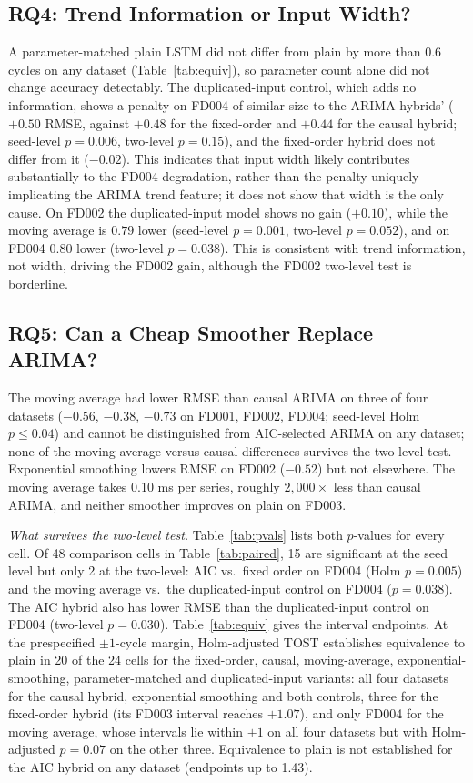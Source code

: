 \documentclass[conference]{IEEEtran}
\begin{document}
\subsection{RQ4: Trend Information or Input Width?}
A parameter-matched plain LSTM did not differ from plain by more than 0.6 cycles on any dataset (Table~\ref{tab:equiv}), so parameter count alone did not change accuracy detectably. The duplicated-input control, which adds no information, shows a penalty on FD004 of similar size to the ARIMA hybrids' ($+0.50$ RMSE, against $+0.48$ for the fixed-order and $+0.44$ for the causal hybrid; seed-level $p=0.006$, two-level $p=0.15$), and the fixed-order hybrid does not differ from it ($-0.02$). This indicates that input width likely contributes substantially to the FD004 degradation, rather than the penalty uniquely implicating the ARIMA trend feature; it does not show that width is the only cause. On FD002 the duplicated-input model shows no gain ($+0.10$), while the moving average is $0.79$ lower (seed-level $p=0.001$, two-level $p=0.052$), and on FD004 $0.80$ lower (two-level $p=0.038$). This is consistent with trend information, not width, driving the FD002 gain, although the FD002 two-level test is borderline.

\subsection{RQ5: Can a Cheap Smoother Replace ARIMA?}
The moving average had lower RMSE than causal ARIMA on three of four datasets ($-0.56$, $-0.38$, $-0.73$ on FD001, FD002, FD004; seed-level Holm $p\le0.04$) and cannot be distinguished from AIC-selected ARIMA on any dataset; none of the moving-average-versus-causal differences survives the two-level test. Exponential smoothing lowers RMSE on FD002 ($-0.52$) but not elsewhere. The moving average takes 0.10 ms per series, roughly $2{,}000\times$ less than causal ARIMA, and neither smoother improves on plain on FD003.

\emph{What survives the two-level test.} Table~\ref{tab:pvals} lists both $p$-values for every cell. Of 48 comparison cells in Table~\ref{tab:paired}, 15 are significant at the seed level but only 2 at the two-level: AIC vs.\ fixed order on FD004 (Holm $p=0.005$) and the moving average vs.\ the duplicated-input control on FD004 ($p=0.038$). The AIC hybrid also has lower RMSE than the duplicated-input control on FD004 (two-level $p=0.030$). Table~\ref{tab:equiv} gives the interval endpoints. At the prespecified $\pm1$-cycle margin, Holm-adjusted TOST establishes equivalence to plain in 20 of the 24 cells for the fixed-order, causal, moving-average, exponential-smoothing, parameter-matched and duplicated-input variants: all four datasets for the causal hybrid, exponential smoothing and both controls, three for the fixed-order hybrid (its FD003 interval reaches $+1.07$), and only FD004 for the moving average, whose intervals lie within $\pm1$ on all four datasets but with Holm-adjusted $p=0.07$ on the other three. Equivalence to plain is not established for the AIC hybrid on any dataset (endpoints up to 1.43).
\end{document}

